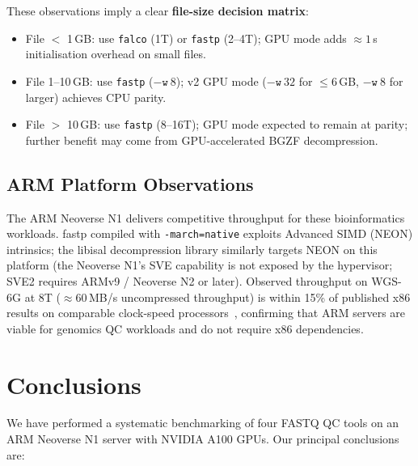 \documentclass[a4paper,12pt]{article}
\begin{document}
\noindent These observations imply a clear \textbf{file-size decision matrix}:

\begin{itemize}
  \item File $<$ 1\,GB: use \texttt{falco} (1T) or \texttt{fastp} (2--4T); GPU mode adds ${\approx}1$\,s initialisation overhead on small files.
  \item File 1--10\,GB: use \texttt{fastp} ($-\texttt{w}~8$); v2 GPU mode (${-}\texttt{w}~32$ for $\le$6\,GB, ${-}\texttt{w}~8$ for larger) achieves CPU parity.
  \item File $>$ 10\,GB: use \texttt{fastp} (8--16T); GPU mode expected to
    remain at parity; further benefit may come from GPU-accelerated BGZF decompression.
\end{itemize}

\subsection{ARM Platform Observations}

The ARM Neoverse N1 delivers competitive throughput for these bioinformatics
workloads.  fastp compiled with \texttt{-march=native} exploits Advanced SIMD
(NEON) intrinsics; the libisal decompression library similarly targets NEON
on this platform (the Neoverse N1's SVE capability is not exposed by the
hypervisor; SVE2 requires ARMv9 / Neoverse N2 or later).  Observed throughput on WGS-6G at 8T (${\approx}60$\,MB/s
uncompressed throughput) is within 15\% of published x86 results on comparable
clock-speed processors~\cite{Chen2018fastp}, confirming that ARM servers are
viable for genomics QC workloads and do not require x86 dependencies.

\section{Conclusions}
\label{sec:conclusions}

We have performed a systematic benchmarking of four FASTQ QC tools on an ARM
Neoverse N1 server with NVIDIA A100 GPUs.  Our principal conclusions are:
\end{document}
